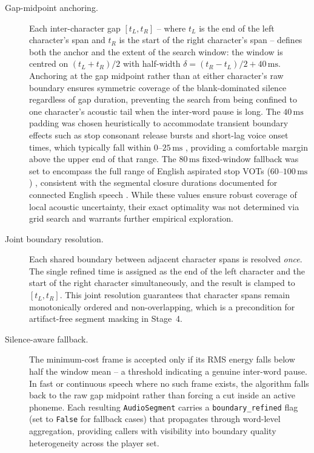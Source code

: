 \documentclass[cameraready]{Interspeech}
\begin{document}
\begin{description}
  \item[Gap-midpoint anchoring.] Each inter-character gap $[t_L, t_R]$ -- where $t_L$ is the end of the left character's span and $t_R$ is the start of the right character's span -- defines both the anchor and the extent of the search window: the window is centred on $(t_L + t_R)/2$ with half-width $\delta = (t_R - t_L)/2 + 40\,\text{ms}$. Anchoring at the gap midpoint rather than at either character's raw boundary ensures symmetric coverage of the blank-dominated silence regardless of gap duration, preventing the search from being confined to one character's acoustic tail when the inter-word pause is long. The $40\,\text{ms}$ padding was chosen heuristically to accommodate transient boundary effects such as stop consonant release bursts and short-lag voice onset times, which typically fall within $0$--$25\,\text{ms}$ \cite{lisker1964cross}, providing a comfortable margin above the upper end of that range. The $80\,\text{ms}$ fixed-window fallback was set to encompass the full range of English aspirated stop VOTs ($60$--$100\,\text{ms}$) \cite{lisker1964cross}, consistent with the segmental closure durations documented for connected English speech \cite{klatt1976linguistic}. While these values ensure robust coverage of local acoustic uncertainty, their exact optimality was not determined via grid search and warrants further empirical exploration.

  \item[Joint boundary resolution.] Each shared boundary between adjacent character spans is resolved \emph{once}. The single refined time is assigned as the end of the left character and the start of the right character simultaneously, and the result is clamped to $[t_L, t_R]$. This joint resolution guarantees that character spans remain monotonically ordered and non-overlapping, which is a precondition for artifact-free segment masking in Stage~4.

  \item[Silence-aware fallback.] The minimum-cost frame is accepted only if its RMS energy falls below half the window mean -- a threshold indicating a genuine inter-word pause. In fast or continuous speech where no such frame exists, the algorithm falls back to the raw gap midpoint rather than forcing a cut inside an active phoneme. Each resulting \texttt{AudioSegment} carries a \texttt{boundary\_refined} flag (set to \texttt{False} for fallback cases) that propagates through word-level aggregation, providing callers with visibility into boundary quality heterogeneity across the player set.
\end{description}
\end{document}

